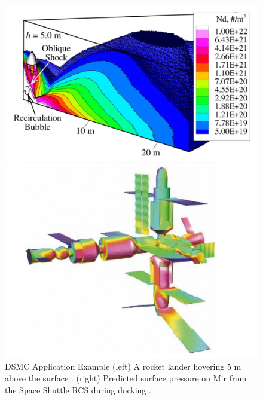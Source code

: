 \begin{figure}
    \centering
  \begin{minipage}[b]{0.49\textwidth}
    \includegraphics[width=\textwidth]{figures/hover_rocket.JPG}
  \end{minipage} %
  \begin{minipage}[b]{0.49\textwidth}
    \includegraphics[width=\textwidth]{figures/mir_shuttle.JPG}

  \end{minipage}
  \caption[DSMC Application Examples]{DSMC Application Example \textmd{(left) A rocket lander hovering 5 m above the surface \cite{hover_rocket}. (right) Predicted surface pressure on Mir from the Space Shuttle RCS during docking \cite{mir_shuttle}.}}
  \label{fig:dsmc_application}
\end{figure}

